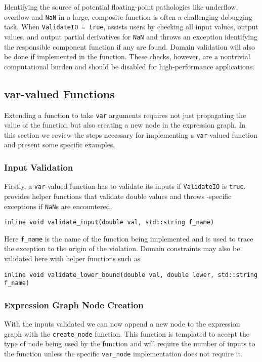 Identifying the source of potential floating-point pathologies like
underflow, overflow and \verb|NaN| in a large, composite function
is often a challenging debugging task.  When \verb|ValidateIO = true|,
\nomad assists users by checking all input values, output values,
and output partial derivatives for \verb|NaN| and throws an
exception identifying the responsible component function if any
are found.  Domain validation will also be done if implemented in
the function.  These checks, however, are a nontrivial computational
burden and should be disabled for high-performance applications.

\subsection{var-valued Functions}

Extending a function to take \verb|var| arguments requires not just propagating the
value of the function but also creating a new node in the expression
graph.  In this section we review the steps necessary for implementing
a \verb|var|-valued function and present some specific examples.

\subsubsection{Input Validation}

Firstly, a \verb|var|-valued function has to validate its inputs if
\verb|ValidateIO| is \verb|true|.  \nomad provides helper functions
that validate double values and throws \nomad-specific exceptions
if \verb|NaN|s are encountered,
%
\begin{verbatim}
inline void validate_input(double val, std::string f_name)
\end{verbatim}
%
Here \verb|f_name| is the name of the function being implemented
and is used to trace the exception to the origin of the violation.
Domain constraints may also be validated here with helper functions
such as
%
\begin{verbatim}
inline void validate_lower_bound(double val, double lower, std::string f_name)
\end{verbatim}

\subsubsection{Expression Graph Node Creation}

With the inputs validated we can now append a new node to the
expression graph with the \verb|create_node| function.  This function
is templated to accept the type of node being used by the function
and will require the number of inputs to the function unless the
specific \verb|var_node| implementation does not require it.

